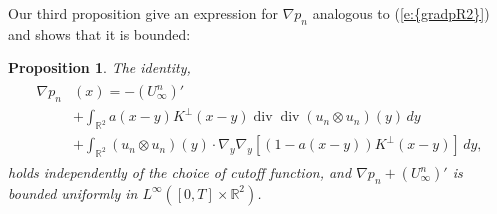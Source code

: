 \documentclass[reqno,openright,11pt,twoside]{amsart}
\newtheorem{prop}[theorem]{Proposition}
\theoremstyle{definition}
\numberwithin{equation}{section}
\begin{document}
Our third proposition give an expression for ${\ensuremath{\nabla}} p_n$ analogous to {(\ref{e:{gradpR2}})} and shows that it is bounded:
\begin{prop}\label{P:gradpBoundR2}
    The identity,
    \begin{align}\label{e:gradpExp}
    \begin{split}
        {\ensuremath{\nabla}} p_n&(x)
			    = -(U_{\ensuremath{\infty}}^n)' \\
			    &
				    + \int_{{\ensuremath{{\ensuremath{\mathbb{{R}}}}}}^2} a(x - y) K^\perp(x - y)
				        \operatorname{div} \operatorname{div} (u_n \otimes u_n)(y) \, dy \\
			    &
	 			    + \int_{{\ensuremath{{\ensuremath{\mathbb{{R}}}}}}^2} (u_n \otimes u_n)(y) \cdot
					    {\ensuremath{\nabla}}_y {\ensuremath{\nabla}}_y {\ensuremath{\left[ {(1 - a(x - y)) K^\perp(x - y)} \right]}}
					    \, dy,
	    \end{split}
    \end{align}
    holds independently of the choice of cutoff function,
    and ${\ensuremath{\nabla}} p_n + (U_{\ensuremath{\infty}}^n)'$ is bounded uniformly in
    $L^{\ensuremath{\infty}}([0, T] \times {\ensuremath{{\ensuremath{\mathbb{{R}}}}}}^2)$.
\end{prop}
\end{document}
